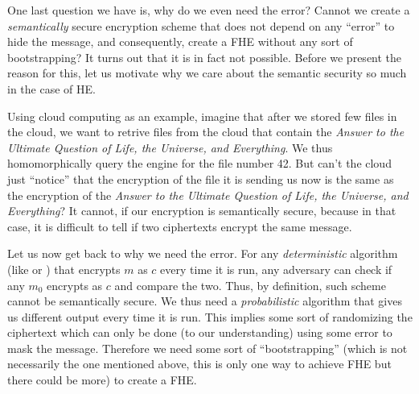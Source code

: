 One last question we have is, why do we even need the error? Cannot we create a \textit{semantically} secure encryption scheme that does not depend on any ``error'' to hide the message, and consequently, create a FHE without any sort of bootstrapping? It turns out that it is in fact not possible. Before we present the reason for this, let us motivate why we care about the semantic security so much in the case of HE.

\begin{example}
	Using cloud computing as an example, imagine that after we stored few files in the cloud, we want to retrive files from the cloud that contain the \textit{Answer to the Ultimate Question of Life, the Universe, and Everything}. We thus homomorphically query the engine for the file number 42. But can't the cloud just ``notice'' that the encryption of the file it is sending us now is the same as the encryption of the \textit{Answer to the Ultimate Question of Life, the Universe, and Everything}? It cannot, if our encryption is semantically secure, because in that case, it is difficult to tell if two ciphertexts encrypt the same message.
\end{example}

Let us now get back to why we need the error. For any \textit{deterministic} algorithm (like  or ) that encrypts $m$ as $c$ every time it is run, any adversary can check if any $m_0$ encrypts as $c$ and compare the two. Thus, by definition, such scheme cannot be semantically secure. We thus need a \textit{probabilistic} algorithm that gives us different output every time it is run. This implies some sort of randomizing the ciphertext which can only be done (to our understanding) using some error to mask the message. Therefore we need some sort of ``bootstrapping'' (which is not necessarily the one mentioned above, this is only one way to achieve FHE but there could be more) to create a FHE.

